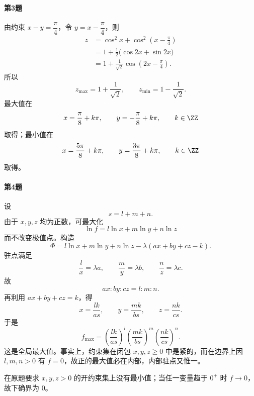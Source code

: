 \paragraph{第3题}
\begin{xsolution}
由约束 $x-y=\dfrac\pi4$，令 $y=x-\dfrac\pi4$，则
\[
\begin{aligned}
  z
  &=\cos^2x+\cos^2\left(x-\frac\pi4\right)\\
  &=1+\frac12\bigl(\cos2x+\sin2x\bigr)\\
  &=1+\frac1{\sqrt2}\cos\left(2x-\frac\pi4\right).
\end{aligned}
\]
所以
\[
  z_{\max}=1+\frac1{\sqrt2},
  \qquad
  z_{\min}=1-\frac1{\sqrt2}.
\]
最大值在
\[
  x=\frac\pi8+k\pi,
  \qquad
  y=-\frac\pi8+k\pi,
  \qquad k\in\ZZ
\]
取得；最小值在
\[
  x=\frac{5\pi}8+k\pi,
  \qquad
  y=\frac{3\pi}8+k\pi,
  \qquad k\in\ZZ
\]
取得。
\end{xsolution}

\paragraph{第4题}
\begin{xsolution}
设
\[
  s=l+m+n.
\]
由于 $x,y,z$ 均为正数，可最大化
\[
  \ln f=l\ln x+m\ln y+n\ln z
\]
而不改变极值点。构造
\[
  \Phi=l\ln x+m\ln y+n\ln z
  -\lambda(ax+by+cz-k).
\]
驻点满足
\[
  \frac lx=\lambda a,
  \qquad
  \frac my=\lambda b,
  \qquad
  \frac nz=\lambda c.
\]
故
\[
  ax:by:cz=l:m:n.
\]
再利用 $ax+by+cz=k$，得
\[
  x=\frac{lk}{as},
  \qquad
  y=\frac{mk}{bs},
  \qquad
  z=\frac{nk}{cs}.
\]
于是
\[
  f_{\max}
  =\left(\frac{lk}{as}\right)^l
   \left(\frac{mk}{bs}\right)^m
   \left(\frac{nk}{cs}\right)^n.
\]
这是全局最大值。事实上，约束集在闭包 $x,y,z\ge0$ 中是紧的，而在边界上因 $l,m,n>0$ 有 $f=0$，故正的最大值必在内部，内部驻点又惟一。

在原题要求 $x,y,z>0$ 的开约束集上没有最小值；当任一变量趋于 $0^+$ 时 $f\to0$，故下确界为 $0$。
\end{xsolution}


